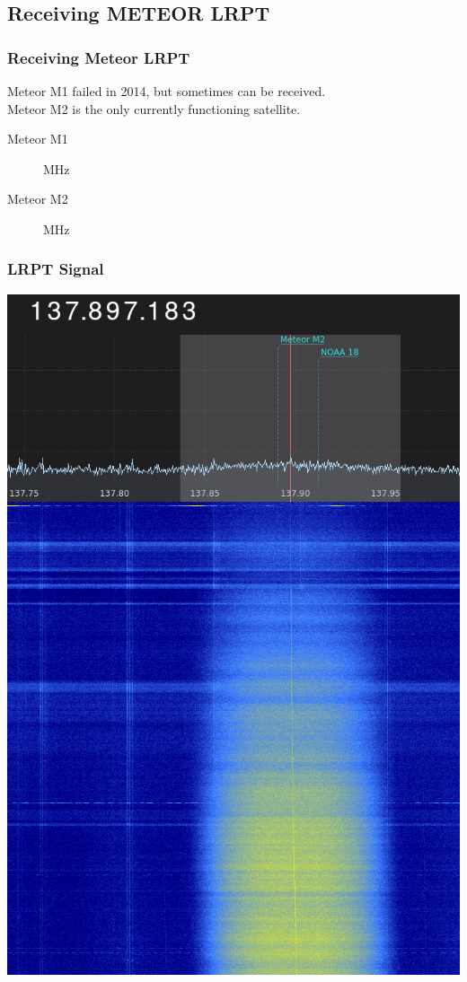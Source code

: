 \documentclass[]{beamer}
\begin{document}
\subsection{Receiving METEOR LRPT}
\begin{frame}
    \frametitle{Receiving Meteor LRPT}
    Meteor M1 failed in 2014, but sometimes can be received.\\
    Meteor M2 is the only currently functioning satellite.
    \begin{description}
        \item[Meteor M1]  MHz
        \item[Meteor M2]  MHz
    \end{description}
\end{frame}
\begin{frame}
    \frametitle{LRPT Signal}
    \begin{center}
        \includegraphics[width=0.75\paperwidth,height=0.75\paperheight,keepaspectratio]{images/lrpt-gqrx.png}
    \end{center}
\end{frame}
\end{document}

